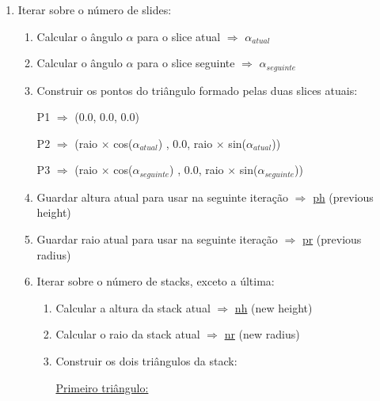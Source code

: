 \documentclass[a4paper]{article}
\begin{document}
\ttfamily
\begin{enumerate}
  \item Iterar sobre o número de slides:
  \begin{enumerate}
    \item Calcular o ângulo $\alpha$ para o slice atual $\Rightarrow$ \underline{$\alpha_{atual}$}
    \item Calcular o ângulo $\alpha$ para o slice seguinte $\Rightarrow$ \underline{$\alpha_{seguinte}$}
    \item Construir os pontos do triângulo formado pelas duas slices atuais:

    \vspace{0.5cm}

        \hspace{3cm} P1 $\Rightarrow$ (0.0, 0.0, 0.0)

    \vspace{0.2cm}

        \hspace{1cm} P2 $\Rightarrow$ (raio $\times$ cos($\alpha_{atual}$) , 0.0, raio $\times$ sin($\alpha_{atual}$))

    \vspace{0.2cm}

        \hspace{0.5cm} P3 $\Rightarrow$ (raio $\times$ cos($\alpha_{seguinte}$) , 0.0, raio $\times$ sin($\alpha_{seguinte}$))

    \vspace{0.3cm}

    \item Guardar altura atual para usar na seguinte iteração $\Rightarrow$ \underline{ph} (previous height)
    \item Guardar raio atual para usar na seguinte iteração $\Rightarrow$ \underline{pr} (previous radius)

    \item Iterar sobre o número de stacks, exceto a última:
    \begin{enumerate}
      \item Calcular a altura da stack atual $\Rightarrow$ \underline{nh} (new height)
      \item Calcular o raio da stack atual $\Rightarrow$ \underline{nr} (new radius)
      \item Construir os dois triângulos da stack:

      \vspace{0.5cm}

      \underline{Primeiro triângulo:}


\end{enumerate}
\end{enumerate}
\end{enumerate}
\end{document}
